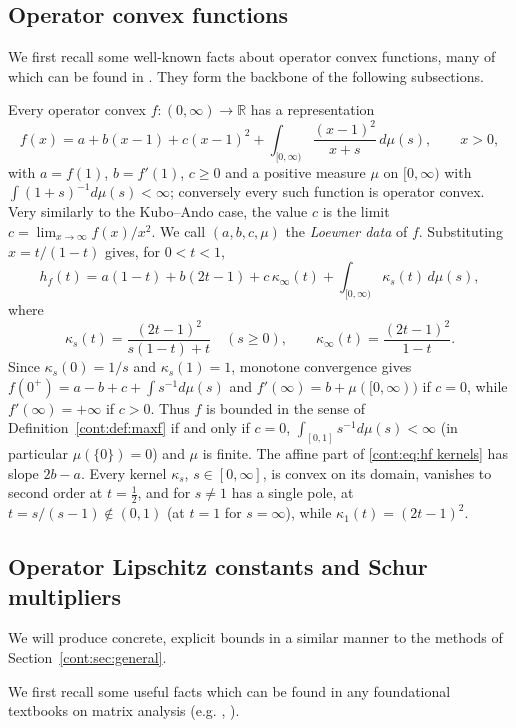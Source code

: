 \subsection{Operator convex functions}
 We first recall some well-known facts about operator convex functions, many of which can be found in \cite{HiaiMosonyi2017}. They form the backbone of the following subsections.

Every operator convex $f:(0,\infty)\to\mathbb{R}$ has a representation \cite[eq.~(2.2)]{HiaiMosonyi2017}
\begin{equation}\label{cont:eq:loewner}
f(x)=a+b(x-1)+c(x-1)^2+\int_{[0,\infty)}\frac{(x-1)^2}{x+s}\,d\mu(s),\qquad x>0,
\end{equation}
with $a=f(1)$, $b=f'(1)$, $c\geq0$ and a positive measure $\mu$ on $[0,\infty)$ with $\int(1+s)^{-1}d\mu(s)<\infty$; conversely every such function is operator convex. Very similarly to the Kubo--Ando case, the value $c$ is the limit $c=\lim_{x\to \infty}f(x)/x^2$. We call $(a,b,c,\mu)$ the \emph{Loewner data} of $f$. Substituting $x=t/(1-t)$ gives, for $0<t<1$,
\begin{equation}\label{cont:eq:hf kernels}
h_f(t)=a(1-t)+b(2t-1)+c\,\kappa_\infty(t)+\int_{[0,\infty)}\kappa_s(t)\,d\mu(s),
\end{equation}
where
\[
\kappa_s(t)=\frac{(2t-1)^2}{s(1-t)+t}\quad(s\geq0),\qquad\kappa_\infty(t)=\frac{(2t-1)^2}{1-t}.
\]
Since $\kappa_s(0)=1/s$ and $\kappa_s(1)=1$, monotone convergence gives $f(0^+)=a-b+c+\int s^{-1}d\mu(s)$ and $f'(\infty)=b+\mu([0,\infty))$ if $c=0$, while $f'(\infty)=+\infty$ if $c>0$. Thus $f$ is bounded in the sense of Definition~\ref{cont:def:maxf} if and only if $c=0$, $\int_{[0,1]}s^{-1}d\mu(s)<\infty$ (in particular $\mu(\{0\})=0$) and $\mu$ is finite. The affine part of \eqref{cont:eq:hf kernels} has slope $2b-a$. Every kernel $\kappa_s$, $s\in[0,\infty]$, is convex on its domain, vanishes to second order at $t=\frac12$, and for $s\neq1$ has a single pole, at $t=s/(s-1)\notin(0,1)$ (at $t=1$ for $s=\infty$), while $\kappa_1(t)=(2t-1)^2$.
 
\subsection{Operator Lipschitz constants and Schur multipliers}
 We will produce concrete, explicit bounds in a similar manner to the methods of Section~\ref{cont:sec:general}.

We first recall some useful facts which can be found in any foundational textbooks on matrix analysis  (e.g. \cite{hiaipetz2014intro}, \cite{bhatia1997matrix}). 

